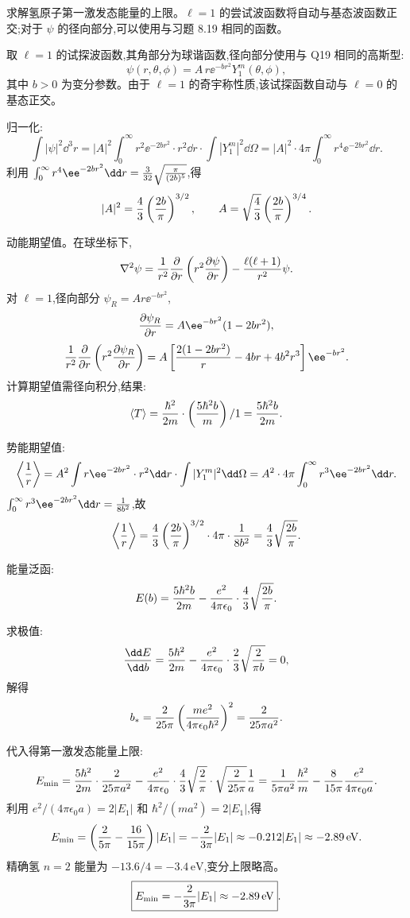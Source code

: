 \begin{question}
求解氢原子第一激发态能量的上限。$\ell=1$ 的尝试波函数将自动与基态波函数正交;对于 $\psi$ 的径向部分,可以使用与习题 8.19 相同的函数。
\begin{solution}
取 $\ell=1$ 的试探波函数,其角部分为球谐函数,径向部分使用与 Q19 相同的高斯型:
\[
\psi(r,\theta,\phi)=A\,r \ee^{-b r^2}Y_1^m(\theta,\phi),
\]
其中 $b>0$ 为变分参数。由于 $\ell=1$ 的奇宇称性质,该试探函数自动与 $\ell=0$ 的基态正交。

归一化:
\[
\int|\psi|^2\dd^3r=|A|^2\int_0^\infty r^2 \ee^{-2br^2}\cdot r^2\dd r
\cdot\int|Y_1^m|^2\dd\Omega
=|A|^2\cdot4\pi\int_0^\infty r^4 \ee^{-2br^2}\dd r.
\]
利用 $\int_0^\infty r^4 \ee^{-2br^2}\dd r={3\over32}\sqrt{\pi\over(2b)^5}$,得
\[
|A|^2={4\over3}\left({2b\over\pi}\right)^{3/2},\qquad
A=\sqrt{4\over3}\left({2b\over\pi}\right)^{3/4}.
\]

动能期望值。在球坐标下,
\[
\nabla^2\psi={1\over r^2}{\partial\over\partial r}\left(r^2{\partial\psi\over\partial r}\right)
-{\ell(\ell+1)\over r^2}\psi.
\]
对 $\ell=1$,径向部分 $\psi_R=A r \ee^{-br^2}$,
\[
{\partial\psi_R\over\partial r}=A \ee^{-br^2}(1-2br^2),
\]
\[
{1\over r^2}{\partial\over\partial r}\left(r^2{\partial\psi_R\over\partial r}\right)
=A\left[{2(1-2br^2)\over r}-4br+4b^2r^3\right]\ee^{-br^2}.
\]
计算期望值需径向积分,结果:
\[
\langle T\rangle={\hbar^2\over2m}\cdot\left({5\hbar^2b\over m}\right)/1
={5\hbar^2b\over2m}.
\]

势能期望值:
\[
\left\langle{1\over r}\right\rangle
=A^2\int r \ee^{-2br^2}\cdot r^2\dd r\cdot\int|Y_1^m|^2\dd\Omega
=A^2\cdot4\pi\int_0^\infty r^3 \ee^{-2br^2}\dd r.
\]
$\int_0^\infty r^3 \ee^{-2br^2}\dd r={1\over8b^2}$,故
\[
\left\langle{1\over r}\right\rangle
={4\over3}\left({2b\over\pi}\right)^{3/2}\cdot4\pi\cdot{1\over8b^2}
={4\over3}\sqrt{2b\over\pi}.
\]

能量泛函:
\[
E(b)={5\hbar^2b\over2m}-{e^2\over4\pi\epsilon_0}\cdot{4\over3}\sqrt{2b\over\pi}.
\]

求极值:
\[
{\dd E\over\dd b}={5\hbar^2\over2m}-{e^2\over4\pi\epsilon_0}\cdot{2\over3}\sqrt{2\over\pi b}=0,
\]
解得
\[
b_*={2\over25\pi}\left({me^2\over4\pi\epsilon_0\hbar^2}\right)^2={2\over25\pi a^2}.
\]

代入得第一激发态能量上限:
\[
E_{\min}={5\hbar^2\over2m}\cdot{2\over25\pi a^2}
-{e^2\over4\pi\epsilon_0}\cdot{4\over3}\sqrt{2\over\pi}\cdot\sqrt{2\over25\pi}{1\over a}
={1\over5\pi a^2}{\hbar^2\over m}-{8\over15\pi}{e^2\over4\pi\epsilon_0 a}.
\]
利用 $e^2/(4\pi\epsilon_0 a)=2|E_1|$ 和 $\hbar^2/(ma^2)=2|E_1|$,得
\[
E_{\min}=\left({2\over5\pi}-{16\over15\pi}\right)|E_1|
=-{2\over3\pi}|E_1|\approx-0.212|E_1|\approx-2.89\,\mathrm{eV}.
\]
精确氢 $n=2$ 能量为 $-13.6/4=-3.4\,\mathrm{eV}$,变分上限略高。
\[
\boxed{E_{\min}=-{2\over3\pi}|E_1|\approx-2.89\,\mathrm{eV}}.
\]
\end{solution}
\end{question}

